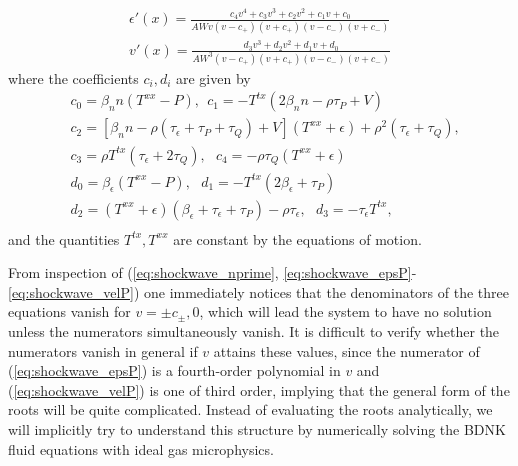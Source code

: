 \documentclass[%
notitlepage,
superscriptaddress,
nofootinbib,
amsmath,
amssymb,
aps,
twocolumn
]{revtex4-1}
\begin{document}
\begin{align}
\epsilon'(x) = \frac{c_4 v^4 + c_3 v^3 + c_2 v^2 + c_1 v + c_0}{A W v (v - c_{+})(v + c_{+})(v - c_{-})(v + c_{-})} \label{eq:shockwave_epsP} \\
v'(x) = \frac{d_3 v^3 + d_2 v^2 + d_1 v + d_0}{A W^3 (v - c_{+})(v + c_{+})(v - c_{-})(v + c_{-})} \label{eq:shockwave_velP} 
\end{align}
where the coefficients $c_i, d_i$ are given by
\begin{equation}
\begin{aligned}
&c_0 = \beta_{n} n (T^{xx} - P), ~~ c_1 = -T^{tx} (2 \beta_{n} n-\rho  \tau_{P}+V) \\
&c_2 = [\beta_{n} n - \rho (\tau_{\epsilon}+\tau_{P}+\tau_{Q}) + V] (T^{xx}+\epsilon) + \rho^2 (\tau_{\epsilon}+\tau_{Q}), \\
&c_3 = \rho  T^{tx} (\tau_{\epsilon}+2 \tau_{Q}), ~~~ c_4 = -\rho \tau_{Q} (T^{xx}+\epsilon) \\
&d_0 = \beta_{\epsilon} (T^{xx} - P), ~~~ d_1 = -T^{tx} (2 \beta_{\epsilon}+\tau_{P})\\
&d_2 = (T^{xx} + \epsilon) (\beta_{\epsilon}+\tau_{\epsilon}+\tau_{P}) - \rho  \tau_{\epsilon}, ~~~ d_3 = - \tau_{\epsilon} T^{tx}, \\
\end{aligned}
\end{equation}
and the quantities $T^{tx}, T^{xx}$ are constant by the equations of motion.

From inspection of (\ref{eq:shockwave_nprime}, \ref{eq:shockwave_epsP}-\ref{eq:shockwave_velP}) one immediately notices that the denominators of the three equations vanish for $v = \pm c_{\pm}, 0$, which will lead the system to have no solution unless the numerators simultaneously vanish.  It is difficult to verify whether the numerators vanish in general if $v$ attains these values, since the numerator of (\ref{eq:shockwave_epsP}) is a fourth-order polynomial in $v$ and (\ref{eq:shockwave_velP}) is one of third order, implying that the general form of the roots will be quite complicated.  Instead of evaluating the roots analytically, we will implicitly try to understand this structure by 
numerically solving the BDNK fluid equations with ideal gas microphysics.
\end{document}
